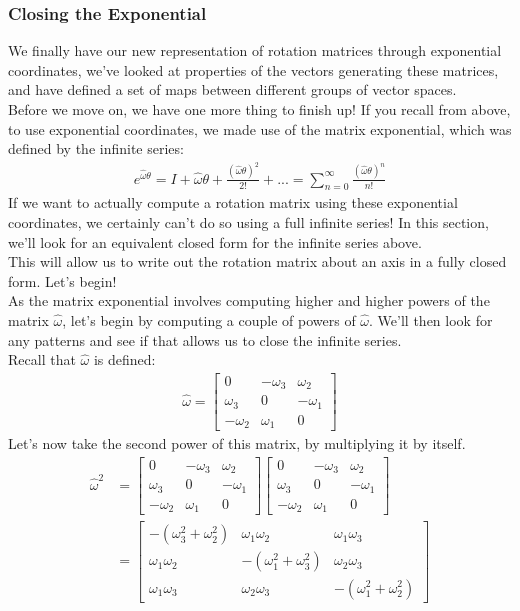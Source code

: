 \documentclass[oneside]{book}
\begin{document}
\subsubsection{Closing the Exponential}
We finally have our new representation of rotation matrices through exponential coordinates, we've looked at properties of the vectors generating these matrices, and have defined a set of maps between different groups of vector spaces.\\
Before we move on, we have one more thing to finish up! If you recall from above, to use exponential coordinates, we made use of the matrix exponential, which was defined by the infinite series:
\begin{align}
    e^{\hat\omega \theta} = I + \hat\omega \theta + \frac{(\hat\omega \theta)^2}{2!} + ... = \sum_{n=0}^\infty \frac{(\hat{\omega}\theta)^n}{n!}
\end{align}
If we want to actually compute a rotation matrix using these exponential coordinates, we certainly can't do so using a full infinite series! In this section, we'll look for an equivalent closed form for the infinite series above.\\
This will allow us to write out the rotation matrix about an axis in a fully closed form. Let's begin!\\
As the matrix exponential involves computing higher and higher powers of the matrix $\hat{\omega}$, let's begin by computing a couple of powers of $\hat{\omega}$. We'll then look for any patterns and see if that allows us to close the infinite series.\\
Recall that $\hat{\omega}$ is defined:
\begin{align}
    \hat\omega  = \begin{bmatrix}
    0 & -\omega_3 & \omega_2\\
    \omega_3 & 0 & -\omega_1\\
    -\omega_2 & \omega_1 & 0
    \end{bmatrix}
\end{align}
Let's now take the second power of this matrix, by multiplying it by itself.
\begin{align}
    \hat{\omega}^2 &= 
    \begin{bmatrix}
    0 & -\omega_3 & \omega_2\\
    \omega_3 & 0 & -\omega_1\\
    -\omega_2 & \omega_1 & 0
    \end{bmatrix}
    \begin{bmatrix}
    0 & -\omega_3 & \omega_2\\
    \omega_3 & 0 & -\omega_1\\
    -\omega_2 & \omega_1 & 0
    \end{bmatrix}\\
    &= 
    \begin{bmatrix}
    -(\omega_3^2 + \omega_2^2) & \omega_1\omega_2 & \omega_1\omega_3\\
    \omega_1\omega_2 &  -(\omega_1^2 + \omega_3^2) & \omega_2\omega_3\\
    \omega_1\omega_3 & \omega_2\omega_3 &  -(\omega_1^2 + \omega_2^2)
    \end{bmatrix}
\end{align}
\end{document}
